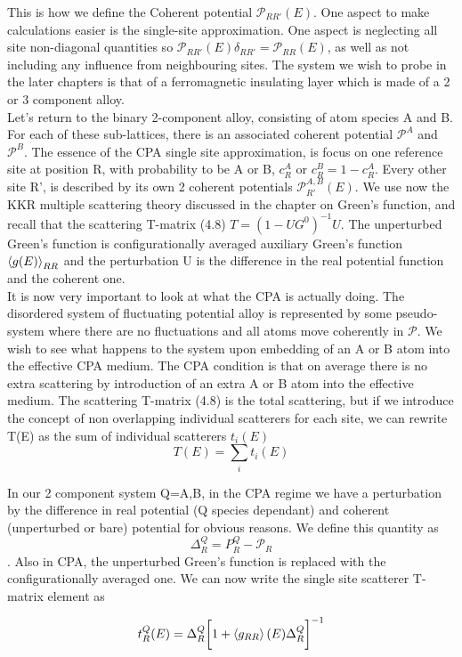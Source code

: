\documentclass[12pt]{article}
\begin{document}
This is how we define the Coherent potential $\mathcal{P}_{RR'}(E)$. One aspect to make calculations easier is the single-site approximation. One aspect is neglecting all site non-diagonal quantities so $\mathcal{P}_{RR'}(E)\delta_{RR'}=\mathcal{P}_{RR}(E)$\cite{turek}, as well as not including any influence from neighbouring sites. The system we wish to probe in the later chapters is that of a ferromagnetic insulating layer which is made of a 2 or 3 component alloy. 
\\Let's return to the binary 2-component alloy, consisting of atom species A and B. For each of these sub-lattices, there is an associated coherent potential $\mathcal{P}^A$ and $\mathcal{P}^B$. The essence of the CPA single site approximation, is focus on one reference site at position R, with probability to be A or B, $c_R^A$ or $c_R^B=1-c_R^A$. Every other site R', is described by its own 2 coherent potentials $\mathcal{P}_{R'}^{A,B}(E)$. We use now the KKR multiple scattering theory discussed in the chapter on Green's function, and recall that the scattering T-matrix (4.8) $T=(1-UG^0)^{-1}U$. The unperturbed Green's function is configurationally averaged auxiliary Green's function $\expval{g(E)}_{RR}$ and the perturbation U is the difference in the real potential function and the coherent one. 
\\
It is now very important to look at what the CPA is actually doing. The disordered system of fluctuating potential alloy is represented by some pseudo-system where there are no fluctuations and all atoms move coherently in $\mathcal{P}$. We wish to see what happens to the system upon embedding of an A or B atom into the effective CPA medium. The CPA condition is that on average there is no extra scattering by introduction of an extra A or B atom into the effective medium. The scattering T-matrix (4.8) is the total scattering, but if we introduce the concept of non overlapping individual scatterers for each site, we can rewrite T(E) as the sum of individual scatterers $t_i(E)$
$$T(E)=\sum_it_i(E)$$

In our 2 component system Q=A,B, in the CPA regime we have a perturbation by the difference in real potential (Q species dependant) and coherent (unperturbed or bare) potential for obvious reasons. We define this quantity as $$\Delta^Q_R=P_R^Q-\mathcal{P}_R$$. Also in CPA, the unperturbed Green's function is replaced with the configurationally averaged one. We can now write the single site scatterer T-matrix element as 

$$t_R^Q(E)=\Delta^Q_R\bigg[1+\expval{g_{RR}}(E)\Delta^Q_R\bigg]^{-1}$$
\end{document}
